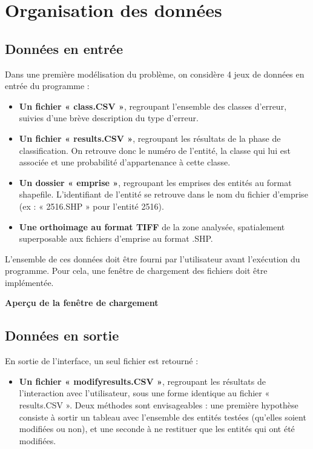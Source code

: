 \section{Organisation des données}

\subsection{Données en entrée}

Dans une première modélisation du problème, on considère 4 jeux de données en entrée du programme :
\begin{itemize}[label=$\rightarrow$]
	\item \textbf{Un fichier « class.CSV »}, regroupant l’ensemble des classes d’erreur, suivies d’une brève description du type d’erreur.
	\item \textbf{Un fichier « results.CSV »}, regroupant les résultats de la phase de classification. On retrouve donc le numéro de l’entité, la classe qui lui est associée et une probabilité d’appartenance à cette classe.
	\item \textbf{Un dossier « emprise »}, regroupant les emprises des entités au format shapefile. L’identifiant de l’entité se retrouve dans le nom du fichier d'emprise (ex : « 2516.SHP » pour l’entité 2516).
	\item \textbf{Une orthoimage au format TIFF} de la zone analysée, spatialement superposable aux fichiers d’emprise au format .SHP.\newline
\end{itemize}


L’ensemble de ces données doit être fourni par l’utilisateur avant l’exécution du programme. Pour cela, une fenêtre de chargement des fichiers doit être implémentée. \newline

\textbf{Aperçu de la fenêtre de chargement}

\subsection{Données en sortie}

En sortie de l'interface, un seul fichier est retourné :
\begin{itemize}[label=$\rightarrow$]
	\item \textbf{Un fichier « modifyresults.CSV »}, regroupant les résultats de l'interaction avec l'utilisateur, sous une forme identique au fichier « results.CSV ». Deux méthodes sont envisageables : une première hypothèse consiste à sortir un tableau avec l'ensemble des entités testées (qu'elles soient modifiées ou non), et une seconde à ne restituer que les entités qui ont été modifiées.\newline
\end{itemize}

